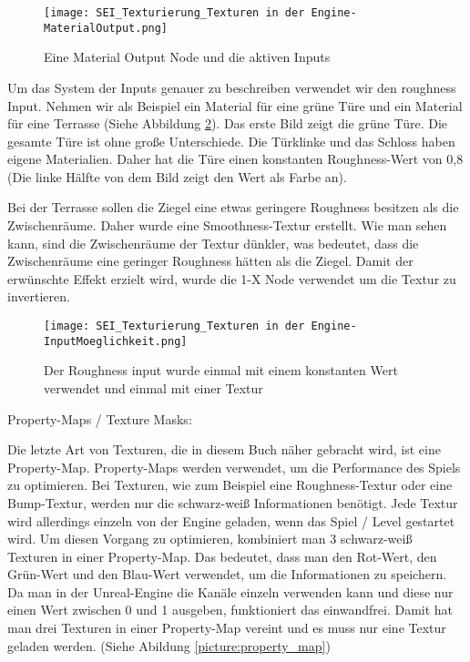 \begin{figure}[H]
    \centering
    \texttt{[image: SEI\_Texturierung\_Texturen in der Engine-MaterialOutput.png]}
    \caption{Eine Material Output Node und die aktiven Inputs}
    \label{picture:mat_ue4_node}
\end{figure}


Um das System der Inputs genauer zu beschreiben verwendet wir den roughness Input. Nehmen wir als Beispiel ein Material
für eine grüne Türe und ein Material für eine Terrasse (Siehe Abbildung \ref{picture:tex_mat_roughness}).
Das erste Bild zeigt die grüne Türe. Die gesamte Türe ist ohne große Unterschiede. Die Türklinke und das Schloss haben
eigene Materialien. Daher hat die Türe einen konstanten Roughness-Wert von 0,8 (Die linke Hälfte von dem Bild zeigt
den Wert als Farbe an).

Bei der Terrasse sollen die Ziegel eine etwas geringere Roughness besitzen als die Zwischenräume. Daher wurde eine
Smoothness-Textur erstellt. Wie man sehen kann, sind die Zwischenräume der Textur dünkler, was bedeutet, dass die
Zwischenräume eine geringer Roughness hätten als die Ziegel. Damit der erwünschte Effekt erzielt wird, wurde die
1-X Node verwendet um die Textur zu invertieren.

\begin{figure}[H]
    \centering
    \texttt{[image: SEI\_Texturierung\_Texturen in der Engine-InputMoeglichkeit.png]}
    \caption{Der Roughness input wurde einmal mit einem konstanten Wert verwendet und einmal mit einer Textur}
    \label{picture:tex_mat_roughness}
\end{figure}


Property-Maps / Texture Masks\citep{ue:tex_property_map}:

Die letzte Art von Texturen, die in diesem Buch näher gebracht wird, ist eine Property-Map. Property-Maps werden
verwendet, um die Performance des Spiels zu optimieren. Bei Texturen, wie zum Beispiel eine Roughness-Textur oder eine
Bump-Textur, werden nur die schwarz-weiß Informationen benötigt. Jede Textur wird allerdings einzeln von der Engine
geladen, wenn das Spiel / Level gestartet wird. Um diesen Vorgang zu optimieren, kombiniert man 3 schwarz-weiß Texturen
in einer Property-Map. Das bedeutet, dass man den Rot-Wert, den Grün-Wert und den Blau-Wert verwendet, um die
Informationen zu speichern. Da man in der Unreal-Engine die Kanäle einzeln verwenden kann und diese nur einen Wert
zwischen 0 und 1 ausgeben, funktioniert das einwandfrei. Damit hat man drei Texturen in einer
Property-Map vereint und es muss nur eine Textur geladen werden. (Siehe Abildung \ref{picture:property_map})

